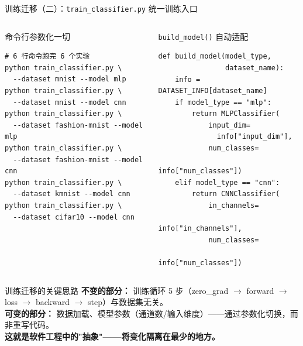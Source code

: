 \documentclass[aspectratio=169]{ctexbeamer}
\begin{document}
\begin{frame}[fragile,shrink=25]{训练迁移（二）：\texttt{train\_classifier.py} 统一训练入口}
\small

\begin{columns}[T]
\begin{block}{命令行参数化一切}
\footnotesize
\begin{lstlisting}[basicstyle=\ttfamily\small, frame=none, numbers=none, backgroundcolor=\color{codebg}]
# 6 行命令跑完 6 个实验
python train_classifier.py \
  --dataset mnist --model mlp
python train_classifier.py \
  --dataset mnist --model cnn
python train_classifier.py \
  --dataset fashion-mnist --model mlp
python train_classifier.py \
  --dataset fashion-mnist --model cnn
python train_classifier.py \
  --dataset kmnist --model cnn
python train_classifier.py \
  --dataset cifar10 --model cnn
\end{lstlisting}
\end{block}

\column{0.48\textwidth}
\begin{block}{\texttt{build\_model()} 自动适配}
\footnotesize
\begin{lstlisting}[basicstyle=\ttfamily\scriptsize, frame=none, numbers=none, backgroundcolor=\color{codebg}]
def build_model(model_type,
                dataset_name):
    info = DATASET_INFO[dataset_name]
    if model_type == "mlp":
        return MLPClassifier(
            input_dim=
              info["input_dim"],
            num_classes=
              info["num_classes"])
    elif model_type == "cnn":
        return CNNClassifier(
            in_channels=
              info["in_channels"],
            num_classes=
              info["num_classes"])
\end{lstlisting}
\end{block}
\end{columns}

\vspace{0.15cm}

\begin{exampleblock}{训练迁移的关键思路}
\footnotesize
\textbf{不变的部分：} 训练循环 5 步（zero\_grad $\to$ forward $\to$ loss $\to$ backward $\to$ step）与数据集无关。\\
\textbf{可变的部分：} 数据加载、模型参数（通道数/输入维度）——通过参数化切换，而非重写代码。\\
\textbf{这就是软件工程中的"抽象"——将变化隔离在最少的地方。}
\end{exampleblock}
\end{frame}
\end{document}
